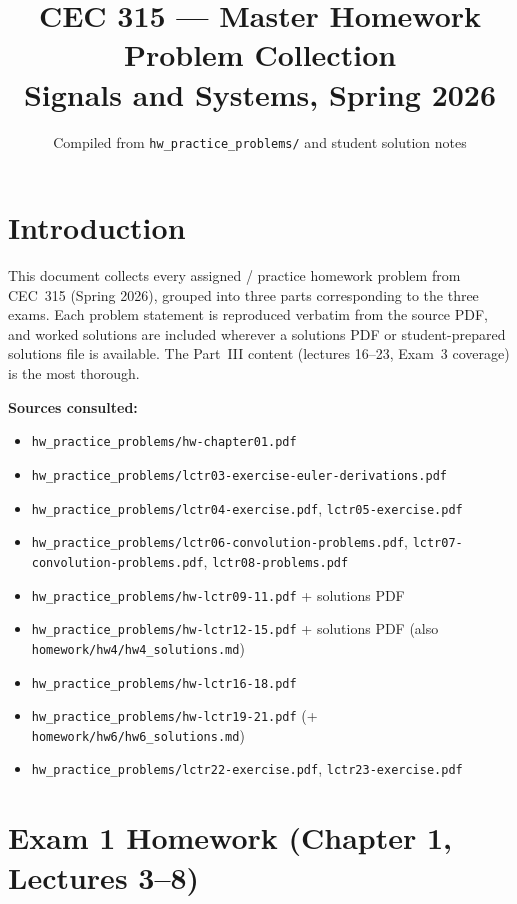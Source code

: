 \documentclass[11pt]{article}
\title{CEC 315 --- Master Homework Problem Collection\\
\large Signals and Systems, Spring 2026}
\author{Compiled from \texttt{hw\_practice\_problems/} and student solution notes}
\date{}
\begin{document}
\maketitle
\tableofcontents
\newpage

\part*{Introduction}

This document collects every assigned / practice homework problem from CEC~315 (Spring 2026), grouped into three parts corresponding to the three exams. Each problem statement is reproduced verbatim from the source PDF, and worked solutions are included wherever a solutions PDF or student-prepared solutions file is available. The Part~III content (lectures 16--23, Exam~3 coverage) is the most thorough.

\textbf{Sources consulted:}
\begin{itemize}[nosep]
  \item \texttt{hw\_practice\_problems/hw-chapter01.pdf}
  \item \texttt{hw\_practice\_problems/lctr03-exercise-euler-derivations.pdf}
  \item \texttt{hw\_practice\_problems/lctr04-exercise.pdf}, \texttt{lctr05-exercise.pdf}
  \item \texttt{hw\_practice\_problems/lctr06-convolution-problems.pdf}, \texttt{lctr07-convolution-problems.pdf}, \texttt{lctr08-problems.pdf}
  \item \texttt{hw\_practice\_problems/hw-lctr09-11.pdf} + solutions PDF
  \item \texttt{hw\_practice\_problems/hw-lctr12-15.pdf} + solutions PDF (also \texttt{homework/hw4/hw4\_solutions.md})
  \item \texttt{hw\_practice\_problems/hw-lctr16-18.pdf}
  \item \texttt{hw\_practice\_problems/hw-lctr19-21.pdf} (+ \texttt{homework/hw6/hw6\_solutions.md})
  \item \texttt{hw\_practice\_problems/lctr22-exercise.pdf}, \texttt{lctr23-exercise.pdf}
\end{itemize}

\newpage

\part{Exam 1 Homework (Chapter 1, Lectures 3--8)}
\end{document}
